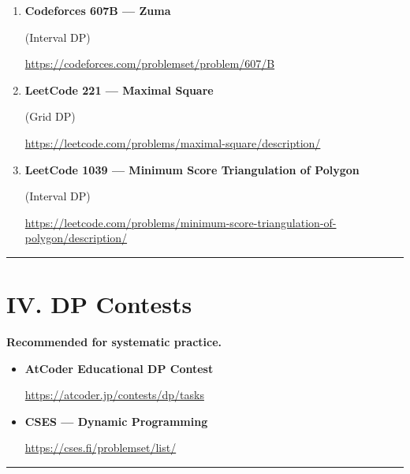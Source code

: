 \documentclass[11pt]{article}
\begin{document}
\begin{enumerate}
\vspace{0.8em}

\item \textbf{Codeforces 607B --- Zuma}

(Interval DP)

\vspace{0.3em}
{\url{https://codeforces.com/problemset/problem/607/B}}

\vspace{0.8em}

\item \textbf{LeetCode 221 --- Maximal Square}

(Grid DP)

\vspace{0.3em}
{\url{https://leetcode.com/problems/maximal-square/description/}}

\vspace{0.8em}

\item \textbf{LeetCode 1039 --- Minimum Score Triangulation of Polygon}

(Interval DP)

\vspace{0.3em}
{\url{https://leetcode.com/problems/minimum-score-triangulation-of-polygon/description/}}

\end{enumerate}

\vspace{1em}
\hrule
\vspace{1em}

\section*{IV. DP Contests}

\textbf{Recommended for systematic practice.}

\begin{itemize}
\item \textbf{AtCoder Educational DP Contest}

{\small\url{https://atcoder.jp/contests/dp/tasks}}

\item \textbf{CSES --- Dynamic Programming}

{\small\url{https://cses.fi/problemset/list/}}

\end{itemize}

\vspace{1em}
\hrule
\vspace{1em}
\end{document}
